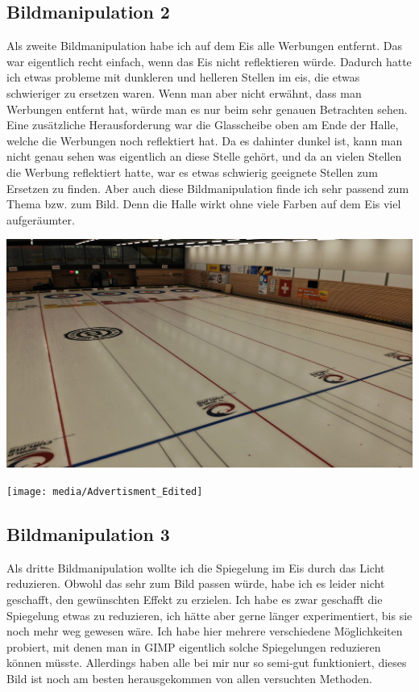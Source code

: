 \documentclass[11pt]{article}
\begin{document}
    \subsection{Bildmanipulation 2}
    Als zweite Bildmanipulation habe ich auf dem Eis alle Werbungen entfernt. Das war eigentlich recht einfach, wenn das Eis nicht reflektieren
    würde. Dadurch hatte ich etwas probleme mit dunkleren und helleren Stellen im eis, die etwas schwieriger zu ersetzen waren. Wenn man aber
    nicht erwähnt, dass man Werbungen entfernt hat, würde man es nur beim sehr genauen Betrachten sehen. Eine zusätzliche Herausforderung war die
    Glasscheibe oben am Ende der Halle, welche die Werbungen noch reflektiert hat. Da es dahinter dunkel ist, kann man nicht genau sehen was
    eigentlich an diese Stelle gehört, und da an vielen Stellen die Werbung reflektiert hatte, war es etwas schwierig geeignete Stellen zum
    Ersetzen zu finden. Aber auch diese Bildmanipulation finde ich sehr passend zum Thema bzw. zum Bild. Denn die Halle wirkt ohne viele Farben
    auf dem Eis viel aufgeräumter.

    \noindent
    \begin{minipage}{0.5\textwidth}
        \includegraphics[width=\linewidth]{media/Advertisment_Unedited}
    \end{minipage}
    \hfill
    \begin{minipage}[c]{0.5\textwidth}
        \texttt{[image: media/Advertisment\_Edited]}
    \end{minipage}

    \subsection{Bildmanipulation 3}
    Als dritte Bildmanipulation wollte ich die Spiegelung im Eis durch das Licht reduzieren. Obwohl das sehr zum Bild passen würde, habe ich es
    leider nicht geschafft, den gewünschten Effekt zu erzielen. Ich habe es zwar geschafft die Spiegelung etwas zu reduzieren, ich hätte aber
    gerne länger experimentiert, bis sie noch mehr weg gewesen wäre. Ich habe hier mehrere verschiedene Möglichkeiten probiert, mit denen man
    in GIMP eigentlich solche Spiegelungen reduzieren können müsste. Allerdings haben alle bei mir nur so semi-gut funktioniert, dieses Bild
    ist noch am besten herausgekommen von allen versuchten Methoden.
\end{document}
